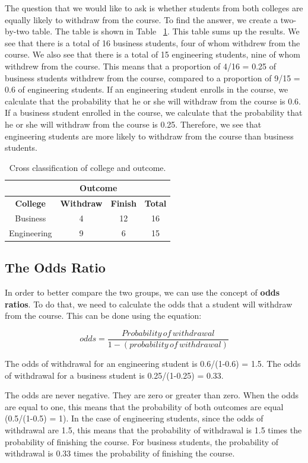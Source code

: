 \documentclass[a4paper,12pt,oneside]{book}
\begin{document}
The question that we would like to ask is whether students from both colleges are equally likely to withdraw from the course. To find the answer, we create a two-by-two table. 
The table is shown in Table ~\ref{table:countfirst}. This table sums up the results. We see that there is a total of 16 business students, four of whom withdrew from the course. We also see that there is a total of 15 engineering students, 
nine of whom withdrew from the course. This means that a proportion of 4/16 = 0.25 of business students withdrew from the course, compared to a proportion of 9/15 = 0.6 of engineering students. If an engineering student 
enrolls in the course, we calculate that the probability that he or she will withdraw from the course is 0.6. If a business student enrolled in the course, we calculate that the probability that he or she will withdraw 
from the course is 0.25. Therefore, we see that engineering students are more likely to withdraw from the course than business students.
\begin{table}[h!t]
	\caption{Cross classification of college and outcome.} \label{table:countfirst}
	\centering
	\begin{tabular}{c |c c| c}
	\hline
	{} & \multicolumn{2}{|c|}{Outcome} & {} \\
	\hline
	\bf College & \bf Withdraw & \bf Finish & \bf Total \\
	Business & 4 & 12 & 16 \\
	Engineering & 9 & 6 & 15 \\
	\hline
	\end{tabular}
\end{table}
\subsection{The Odds Ratio}
In order to better compare the two groups, we can use the concept of \textbf{odds ratios}. To do that, we need to calculate the odds that a student will withdraw from the course. This can be done using the equation:

$$ odds=\frac{Probability\, of\, withdrawal}{1-(probability\, of\, withdrawal)} $$

The odds of withdrawal for an engineering student is 0.6/(1-0.6) = 1.5. The odds of withdrawal for a business student is 0.25/(1-0.25) = 0.33. 

The odds are never negative. They are zero or greater than zero. When the odds are equal to one, this means that the probability of both outcomes are equal (0.5/(1-0.5) = 1). In the case of engineering students, 
since the odds of withdrawal are 1.5, this means that the probability of withdrawal is 1.5 times the probability of finishing the course. For business students, the probability of withdrawal is 0.33 times the 
probability of finishing the course.
\end{document}
